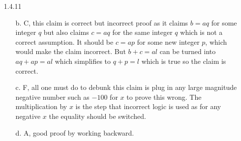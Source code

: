 \documentclass[11pt]{amsart}
\theoremstyle{definition}
\begin{document}
\begin{itemize}
\begin{itemize}
    \item[b.] \begin{proof}
        Assume $a$, $b$, and $c$ are integers that satisfy $a|b$ and $a|b+c$ so that $b=ak$ and $b+c=aj$ for some $k,j\in\mathbb{Z}$. The statement $a|3c$ is true iff
        \begin{align*}
            3c&=ah &\iff \\
            3(aj-b)&=ah &\iff \\
            3aj-3b&=ah &\iff \\
            3aj-3ak&=ah &\iff \\
            3(j-k)&=h &\text{for some }h\in\mathbb{Z}
        \end{align*}
        Since the final statement is true all previous statements are true including $a|3c$ for all integers $a$, $b$, and $c$ that satisfy $a|b$ and $a|b+c$.
    \end{proof}

    \item[c.] \begin{proof}
        Assume $a$, $b$, and $c$ are integers that satisfy $ab > 0$ and $bc < 0$. The statement "$ax^2+bx+c=0$ has two real solutions" is true iff:
        \begin{align*}
            x&=\frac{-b\pm\sqrt{b^2-4ac}}{2a} &\text{has two real solutions, iff} \\
            0&<b^2-4ac &\iff \\
            4ac&<b^2 &\text{ since }ab(bc)<0\text{ and therefore }4ac<0
        \end{align*}
        Since the final statement is true all previous statements are true including "$ax^2+bx+c=0$ has two real solutions." Thus we have proved that $ax^2+bx+c=0$ has two real solutions if integers $a$, $b$, and $c$ satisfy $ab > 0$ and $bc < 0$.
    \end{proof}

\end{itemize}

\item[1.4.11]
\begin{itemize}
    \item[b.] C, this claim is correct but incorrect proof as it claims $b=aq$ for some integer $q$ but also claims $c=aq$ for the same integer $q$ which is not a correct assumption. It should be $c=ap$ for some new integer $p$, which would make the claim incorrect. But $b+c=al$ can be turned into $aq+ap=al$ which simplifies to $q+p=l$ which is true so the claim is correct.

    \item[c.] F, all one must do to debunk this claim is plug in any large magnitude negative number such as $-100$ for $x$ to prove this wrong. The multiplication by $x$ is the step that incorrect logic is used as for any negative $x$ the equality should be switched.

    \item[d.] A, good proof by working backward.

\end{itemize}

\end{itemize}
\end{document}
